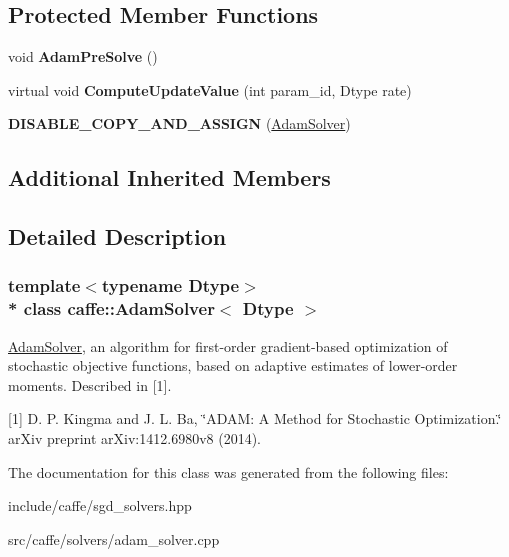 \subsection*{Protected Member Functions}
\begin{DoxyCompactItemize}
\item 
void {\bfseries Adam\+Pre\+Solve} ()\hypertarget{classcaffe_1_1AdamSolver_a72bbfc1fb2ec2194b183fa65f77ef1fb}{}\label{classcaffe_1_1AdamSolver_a72bbfc1fb2ec2194b183fa65f77ef1fb}

\item 
virtual void {\bfseries Compute\+Update\+Value} (int param\+\_\+id, Dtype rate)\hypertarget{classcaffe_1_1AdamSolver_a11f2c48ead67c91ba9e871acdbda1af8}{}\label{classcaffe_1_1AdamSolver_a11f2c48ead67c91ba9e871acdbda1af8}

\item 
{\bfseries D\+I\+S\+A\+B\+L\+E\+\_\+\+C\+O\+P\+Y\+\_\+\+A\+N\+D\+\_\+\+A\+S\+S\+I\+GN} (\hyperlink{classcaffe_1_1AdamSolver}{Adam\+Solver})\hypertarget{classcaffe_1_1AdamSolver_a5f192e195185ab841f083415333f5147}{}\label{classcaffe_1_1AdamSolver_a5f192e195185ab841f083415333f5147}

\end{DoxyCompactItemize}
\subsection*{Additional Inherited Members}


\subsection{Detailed Description}
\subsubsection*{template$<$typename Dtype$>$\\*
class caffe\+::\+Adam\+Solver$<$ Dtype $>$}

\hyperlink{classcaffe_1_1AdamSolver}{Adam\+Solver}, an algorithm for first-\/order gradient-\/based optimization of stochastic objective functions, based on adaptive estimates of lower-\/order moments. Described in \mbox{[}1\mbox{]}. 

\mbox{[}1\mbox{]} D. P. Kingma and J. L. Ba, \char`\"{}\+A\+D\+A\+M\+: A Method for Stochastic Optimization.\char`\"{} ar\+Xiv preprint ar\+Xiv\+:1412.\+6980v8 (2014). 

The documentation for this class was generated from the following files\+:\begin{DoxyCompactItemize}
\item 
include/caffe/sgd\+\_\+solvers.\+hpp\item 
src/caffe/solvers/adam\+\_\+solver.\+cpp\end{DoxyCompactItemize}
